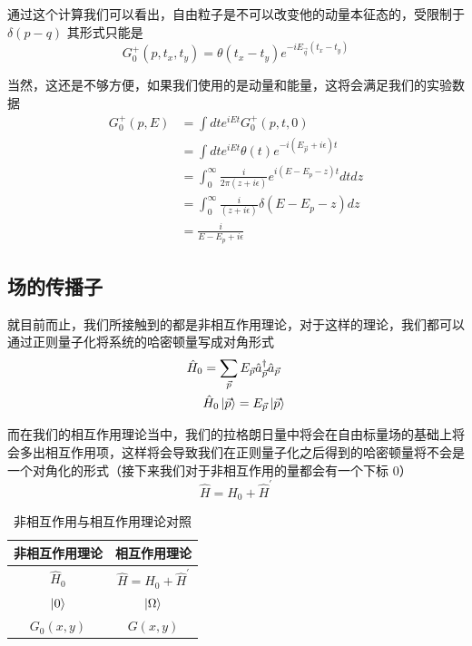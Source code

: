 \documentclass{article}
\begin{document}
通过这个计算我们可以看出，自由粒子是不可以改变他的动量本征态的，受限制于 $\delta(p - q)$ 其形式只能是
\begin{equation*}
    G^{+}_0(p,t_x,t_y) = \theta(t_x - t_y)e^{-iE_{\vec{q}}(t_x - t_y)}
\end{equation*}

当然，这还是不够方便，如果我们使用的是动量和能量，这将会满足我们的实验数据
\begin{align*}
    G_0^{+}(p,E) &= \int dt e^{iEt}G_0^{+}(p,t,0) \\
    &= \int dt e^{iEt}\theta(t)e^{-i(E_{\vec{p}} + i\epsilon) t} \\
    &= \int_{0}^{\infty} \frac{i}{2\pi(z + i\epsilon)} e^{i(E - E_p -z)t}dt dz\\
    &= \int_{0}^{\infty} \frac{i}{(z + i\epsilon)} \delta(E - E_p -z) dz\\
    &= \frac{i}{E - E_p + i\epsilon}
\end{align*}





\subsection{场的传播子}

就目前而止，我们所接触到的都是非相互作用理论，对于这样的理论，我们都可以通过正则量子化将系统的哈密顿量写成对角形式
\begin{align*}
    \hat{H}_0 &= \sum_{\vec{p}}E_{\vec{p}}\hat{a}_{\vec{p}}^\dagger\hat{a}_{\vec{p}} \\
    &\hat{H}_0\ket{\vec{p}} = E_{\vec{p}}\ket{\vec{p}} 
\end{align*}

而在我们的相互作用理论当中，我们的拉格朗日量中将会在自由标量场的基础上将会多出相互作用项，这样将会导致我们在正则量子化之后得到的哈密顿量将不会是一个对角化的形式（接下来我们对于非相互作用的量都会有一个下标 $0$）
\begin{equation*}
    \hat{H} = \hat{H}_0 + \hat{H}^\prime
\end{equation*}

\begin{table}[hbpt]
    \centering
    \caption{非相互作用与相互作用理论对照}
    \begin{tabular*}{0.4\textwidth}{cc}
        \hline
        非相互作用理论 & 相互作用理论 \\ \hline
        $\hat{H}_0$ & $\hat{H} = \hat{H}_0 + \hat{H}^\prime$ \\ \hline 
        $\ket{0}$ & $\ket{\Omega}$ \\ \hline
        $G_0(x,y)$ & $G(x,y)$ \\ \hline
    \end{tabular*}
\end{table}
\end{document}
